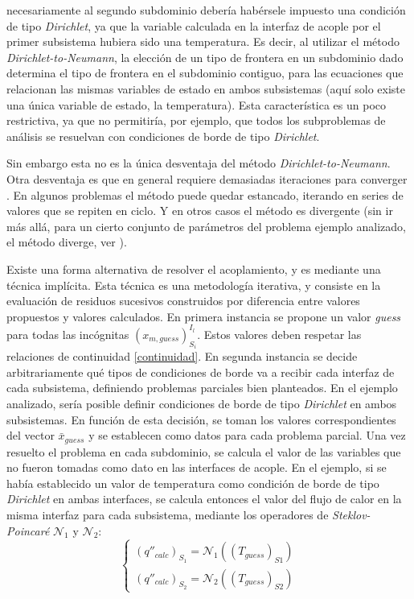 necesariamente al segundo subdominio debería habérsele impuesto una condición de tipo \textit{Dirichlet},
ya que la variable calculada en la interfaz de acople por el primer subsistema hubiera sido una temperatura.
Es decir, al utilizar el método \textit{Dirichlet-to-Neumann}, la elección de un tipo de frontera en un subdominio dado determina el tipo de frontera en el subdominio contiguo,
para las ecuaciones que relacionan las mismas variables de estado en ambos subsistemas (aquí solo existe una única variable de estado, la temperatura).
Esta característica es un poco restrictiva, ya que no permitiría, por ejemplo, que todos los subproblemas de análisis se resuelvan con condiciones de borde de tipo \textit{Dirichlet}.

Sin embargo esta no es la única desventaja del método \textit{Dirichlet-to-Neumann}.
Otra desventaja es que en general requiere demasiadas iteraciones para converger \cite{fede-enief2016}.
En algunos problemas el método puede quedar estancado, iterando en series de valores que se repiten en ciclo.
Y en otros casos el método es divergente (sin ir más allá, para un cierto conjunto de parámetros del problema ejemplo analizado, el método diverge, ver \cite{coup-strong}).

Existe una forma alternativa de resolver el acoplamiento, y es mediante una técnica implícita.
Esta técnica es una metodología iterativa, y consiste en la evaluación de residuos sucesivos construidos por diferencia entre valores propuestos y valores calculados.
En primera instancia se propone un valor \textit{guess} para todas las incógnitas $(x_{m,guess})_{S_i}^{I_l}$.
Estos valores deben respetar las relaciones de continuidad \ref{continuidad}.
En segunda instancia se decide arbitrariamente qué tipos de condiciones de borde va a recibir cada interfaz de cada subsistema,
definiendo problemas parciales bien planteados.
En el ejemplo analizado, sería posible definir condiciones de borde de tipo \textit{Dirichlet} en ambos subsistemas.
En función de esta decisión, se toman los valores correspondientes del vector $\bar{x}_{guess}$ y se establecen como datos para cada problema parcial.
Una vez resuelto el problema en cada subdominio, se calcula el valor de las variables que no fueron tomadas como dato en las interfaces de acople.
En el ejemplo, si se había establecido un valor de temperatura como condición de borde de tipo \textit{Dirichlet} en ambas interfaces,
se calcula entonces el valor del flujo de calor en la misma interfaz para cada subsistema, mediante los operadores de \textit{Steklov-Poincaré} $\mathscr{N}_1$ y $\mathscr{N}_2$:
\begin{equation}
\left\{\begin{matrix}
(q''_{calc})_{S_1}  = \mathscr{N}_1\left ((T_{guess})_{S1}\right ) \\
(q''_{calc})_{S_2}  = \mathscr{N}_2\left ((T_{guess})_{S2}\right )
\end{matrix}\right.
\label{qq_nn_tt}
\end{equation}

